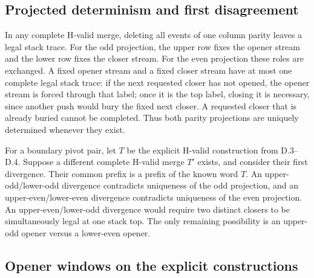 \documentclass[11pt]{article}
\theoremstyle{definition}
\theoremstyle{remark}
\begin{document}
\subsection{Projected determinism and first
disagreement}\label{d.7.-projected-determinism-and-first-disagreement}

In any complete H-valid merge, deleting all events of one column parity
leaves a legal stack trace. For the odd projection, the upper row fixes
the opener stream and the lower row fixes the closer stream. For the
even projection these roles are exchanged. A fixed opener stream and a
fixed closer stream have at most one complete legal stack trace:
if the next requested closer has not opened, the opener stream is forced
through that label; once it is the top label, closing it is necessary,
since another push would bury the fixed next closer. A requested closer
that is already buried cannot be completed. Thus both parity projections
are uniquely determined whenever they exist.

For a boundary pivot pair, let $T$ be the explicit H-valid construction
from D.3--D.4. Suppose a different complete H-valid merge $T'$ exists,
and consider their first divergence. Their common prefix is a prefix
of the known word $T$. An upper-odd/lower-odd divergence contradicts
uniqueness of the odd projection, and an upper-even/lower-even divergence
contradicts uniqueness of the even projection. An upper-even/lower-odd
divergence would require two distinct closers to be simultaneously legal
at one stack top. The only remaining possibility is an upper-odd opener
versus a lower-even opener.

\subsection{Opener windows on the explicit
constructions}\label{d.8.-corrected-cross-parity-windows}
\end{document}
